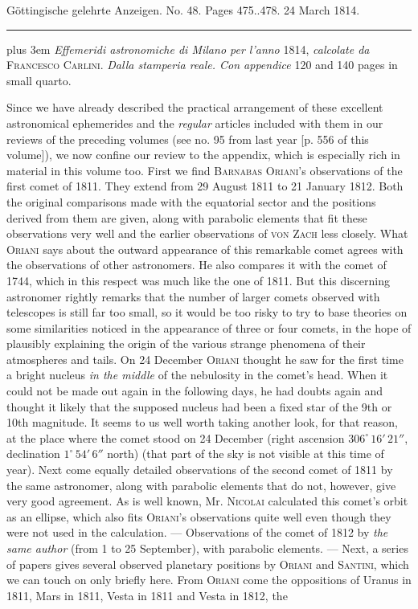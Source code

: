 \clearpage
{}
\hypertarget{native-571-lower}{}
\begin{center}\small Göttingische gelehrte Anzeigen. No. 48. Pages 475..478. 24 March 1814.\\[3pt]\rule{.72\linewidth}{.3pt}\end{center}

{\rightskip=0pt plus 3em \emph{Effemeridi astronomiche di Milano per l'anno} 1814, \emph{calcolate da} \textsc{Francesco Carlini}. \emph{Dalla stamperia reale. Con appendice} 120 and 140 pages in small quarto.\par}

Since we have already described the practical arrangement of these excellent astronomical ephemerides and the \emph{regular} articles included with them in our reviews of the preceding volumes (see no. 95 from last year [p. 556 of this volume]), we now confine our review to the appendix, which is especially rich in material in this volume too. First we find \textsc{Barnabas Oriani}'s observations of the first comet of 1811. They extend from 29 August 1811 to 21 January 1812. Both the original comparisons made with the equatorial sector and the positions derived from them are given, along with parabolic elements that fit these observations very well and the earlier observations of \textsc{von Zach} less closely. What \textsc{Oriani} says about the outward appearance of this remarkable comet agrees with the observations of other astronomers. He also compares it with the comet of 1744, which in this respect was much like the one of 1811. But this discerning astronomer rightly remarks that the number of larger comets observed with telescopes is still far too small, so it would be too risky to try to base theories on some similarities noticed in the appearance of three or four comets, in the hope of plausibly explaining the origin of the various strange phenomena of their atmospheres and tails. On 24 December \textsc{Oriani} thought he saw for the first time a bright nucleus \emph{in the middle} of the nebulosity in the comet's head. When it could not be made out again in the following days, he had doubts again and thought it likely that the supposed nucleus had been a fixed star of the 9th or 10th magnitude. It seems to us well worth taking another look, for that reason, at the place where the comet stood on 24 December (right ascension $306^\circ\,16'\,21''$, declination $1^\circ\,54'\,6''$ north) (that part of the sky is not visible at this time of year). Next come equally detailed observations of the second comet of 1811 by the same astronomer, along with parabolic elements that do not, however, give very good agreement. As is well known, Mr. \textsc{Nicolai} calculated this comet's orbit as an ellipse, which also fits \textsc{Oriani}'s observations quite well even though they were not used in the calculation. --- Observations of the comet of 1812 by \emph{the same author} (from 1 to 25 September), with parabolic elements. --- Next, a series of papers gives several observed planetary positions by \textsc{Oriani} and \textsc{Santini}, which we can touch on only briefly here. From \textsc{Oriani} come the oppositions of Uranus in 1811, Mars in 1811, Vesta in 1811 and Vesta in 1812, the 